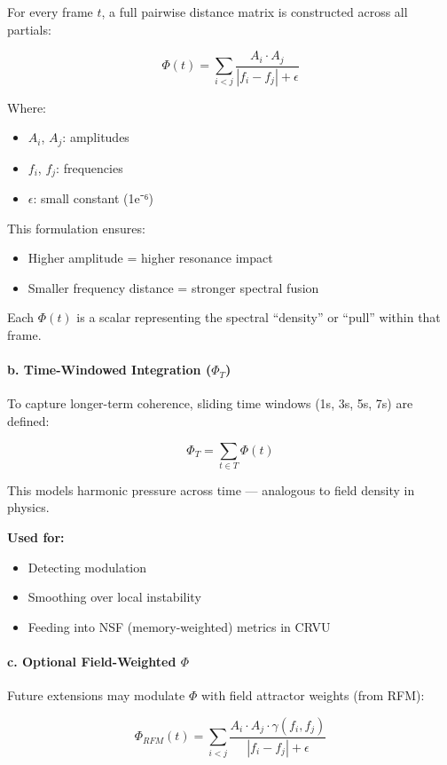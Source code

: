 For every frame $t$, a full pairwise distance matrix is constructed across all partials:

\[
\Phi(t) = \sum_{i<j} \frac{A_i \cdot A_j}{|f_i - f_j| + \epsilon}
\]

Where:

\begin{itemize}
    \item $A_i$, $A_j$: amplitudes
    \item $f_i$, $f_j$: frequencies
    \item $\epsilon$: small constant (1e⁻⁶)
\end{itemize}

This formulation ensures:

\begin{itemize}
    \item Higher amplitude = higher resonance impact
    \item Smaller frequency distance = stronger spectral fusion
\end{itemize}

Each $\Phi(t)$ is a scalar representing the spectral “density” or “pull” within that frame.

\paragraph{b. Time-Windowed Integration ($\Phi_T$)}

To capture longer-term coherence, sliding time windows (1s, 3s, 5s, 7s) are defined:

\[
\Phi_T = \sum_{t \in T} \Phi(t)
\]

This models harmonic pressure across time — analogous to field density in physics.

\textbf{Used for:}
\begin{itemize}
    \item Detecting modulation
    \item Smoothing over local instability
    \item Feeding into NSF (memory-weighted) metrics in CRVU
\end{itemize}

\paragraph{c. Optional Field-Weighted $\Phi$}

Future extensions may modulate $\Phi$ with field attractor weights (from RFM):

\[
\Phi_{RFM}(t) = \sum_{i<j} \frac{A_i \cdot A_j \cdot \gamma(f_i, f_j)}{|f_i - f_j| + \epsilon}
\]

